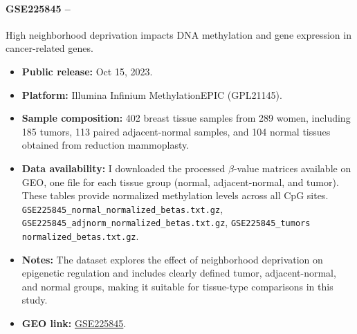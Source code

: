 \documentclass[10pt]{extarticle}
\begin{document}
\paragraph{GSE225845 --} High neighborhood deprivation impacts DNA methylation and gene expression in cancer-related genes.  
\begin{itemize}[label=-]
  \item \textbf{Public release:} Oct 15, 2023.
  \item \textbf{Platform:} Illumina Infinium MethylationEPIC (GPL21145).  
  \item \textbf{Sample composition:} 402 breast tissue samples from 289 women, including 185 tumors, 113 paired adjacent-normal samples, and 104 normal tissues obtained from reduction mammoplasty.
  \item \textbf{Data availability:} I downloaded the processed $\beta$-value matrices available on GEO, one file for each tissue group (normal, adjacent-normal, and tumor). These tables provide normalized methylation levels across all CpG sites.  
  \texttt{GSE225845\_normal\_normalized\_betas.txt.gz}, \texttt{GSE225845\_adjnorm\_normalized\_betas.txt.gz}, \texttt{GSE225845\_tumors} \\ \texttt{normalized\_betas.txt.gz}.
  \item \textbf{Notes:} The dataset explores the effect of neighborhood deprivation on epigenetic regulation and includes clearly defined tumor, adjacent-normal, and normal groups, making it suitable for tissue-type comparisons in this study.
  \item \textbf{GEO link:} \href{https://www.ncbi.nlm.nih.gov/geo/query/acc.cgi?acc=GSE225845}{GSE225845}.
\end{itemize}
\end{document}
